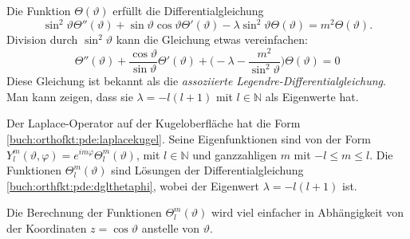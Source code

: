 Die Funktion $\Theta(\vartheta)$ erfüllt die Differentialgleichung
\[
\sin^2\vartheta \Theta''(\vartheta)
+
\sin\vartheta\cos\vartheta
\Theta'(\vartheta)
-
\lambda\sin^2\vartheta
\Theta(\vartheta)
=
m^2 \Theta(\vartheta).
\]
Division durch $\sin^2\vartheta$ kann die Gleichung etwas vereinfachen:
\begin{equation}
\Theta''(\vartheta)
+
\frac{\cos\vartheta}{\sin\vartheta} \Theta'(\vartheta)
+\biggl(
-
\lambda
-
\frac{m^2}{\sin^2\vartheta} 
\biggr)
\Theta(\vartheta)
=
0
\label{buch:orthfkt:pde:dglthetaphi}
\end{equation}
Diese Gleichung ist bekannt als die {\em assoziierte
Legendre-Differentialgleichung}.
Man kann zeigen, dass sie $\lambda=-l(l+1)$ mit $l\in\mathbb{N}$
als Eigenwerte hat.

\begin{satz}
\label{buch:orthofkt:pde:satz:kugel}
Der Laplace-Operator auf der Kugeloberfläche hat die Form
\eqref{buch:orthofkt:pde:laplacekugel}.
Seine Eigenfunktionen sind von der Form
$Y_l^m(\vartheta,\varphi)=e^{im\varphi}\Theta_l^m(\vartheta)$,
mit $l\in \mathbb{N}$ und ganzzahligen $m$ mit $-l\le m\le l$.
Die Funktionen $\Theta_l^m(\vartheta)$ sind Lösungen der
Differentialgleichung \eqref{buch:orthfkt:pde:dglthetaphi}, wobei
der Eigenwert $\lambda = -l(l+1)$ ist.
\end{satz}

Die Berechnung der Funktionen $\Theta_l^m(\vartheta)$ wird viel
einfacher in Abhängigkeit von der Koordinaten $z=\cos\vartheta$
anstelle von $\vartheta$.

%
%
